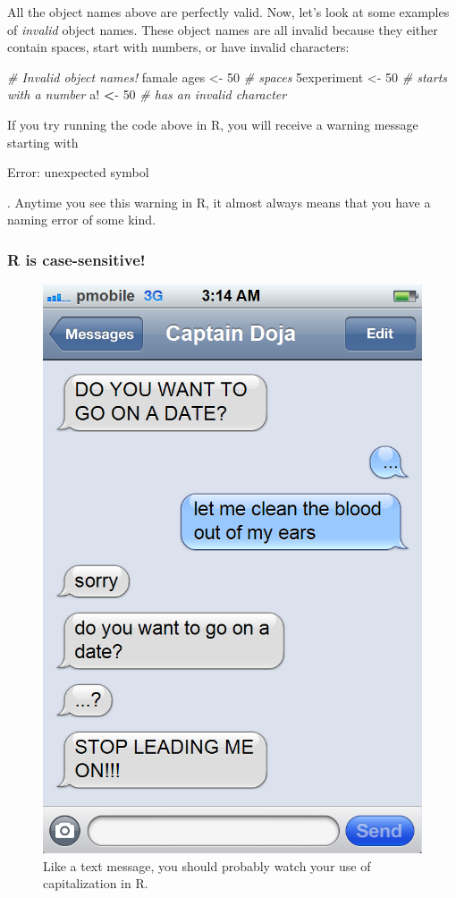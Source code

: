 \documentclass[
]{book}
\newenvironment{Shaded}{\begin{snugshade}}{\end{snugshade}}
\newcommand{\CommentTok}[1]{\textcolor[rgb]{0.56,0.35,0.01}{\textit{#1}}}
\newcommand{\DecValTok}[1]{\textcolor[rgb]{0.00,0.00,0.81}{#1}}
\newcommand{\ErrorTok}[1]{\textcolor[rgb]{0.64,0.00,0.00}{\textbf{#1}}}
\newcommand{\NormalTok}[1]{#1}
\newcommand{\OtherTok}[1]{\textcolor[rgb]{0.56,0.35,0.01}{#1}}
\newcommand{\SpecialCharTok}[1]{\textcolor[rgb]{0.00,0.00,0.00}{#1}}
\begin{document}
All the object names above are perfectly valid. Now, let's look at some examples of \emph{invalid} object names. These object names are all invalid because they either contain spaces, start with numbers, or have invalid characters:

\begin{Shaded}
\begin{Highlighting}[]
\CommentTok{\# Invalid object names!}
\NormalTok{famale ages }\OtherTok{\textless{}{-}} \DecValTok{50} \CommentTok{\# spaces}
\NormalTok{5experiment }\OtherTok{\textless{}{-}} \DecValTok{50} \CommentTok{\# starts with a number}
\NormalTok{a}\SpecialCharTok{!} \ErrorTok{\textless{}}\SpecialCharTok{{-}} \DecValTok{50} \CommentTok{\# has an invalid character}
\end{Highlighting}
\end{Shaded}

If you try running the code above in R, you will receive a warning message starting with

Error: unexpected symbol

. Anytime you see this warning in R, it almost always means that you have a naming error of some kind.

\hypertarget{r-is-case-sensitive}{%
\subsubsection{R is case-sensitive!}\label{r-is-case-sensitive}}

\begin{figure}

{\centering \includegraphics[width=0.5\linewidth]{images/chapter-2/datetext} 

}

\caption{Like a text message, you should probably watch your use of capitalization in R.}\label{fig:datetext}
\end{figure}
\end{document}
